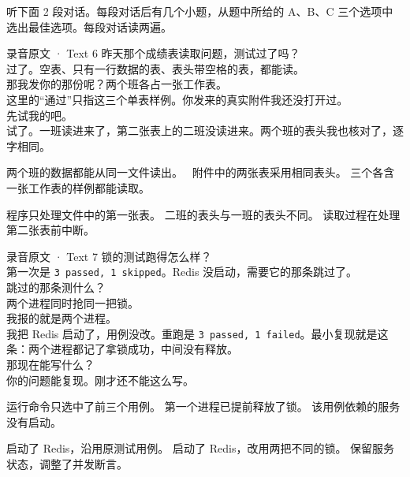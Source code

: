 \documentclass[UTF8, zihao=5, a4paper, fontset=fandol]{ctexart}
\begin{document}

听下面 2 段对话。每段对话后有几个小题，从题中所给的 A、B、C 三个选项中选出最佳选项。每段对话读两遍。

\medskip{}
\begin{ListeningScript}{录音原文 · Text 6}
\urole 昨天那个成绩表读取问题，测试过了吗？\\
\arole 过了。空表、只有一行数据的表、表头带空格的表，都能读。\\
\urole 那我发你的那份呢？两个班各占一张工作表。\\
\arole 这里的“通过”只指这三个单表样例。你发来的真实附件我还没打开过。\\
\urole 先试我的吧。\\
\arole 试了。一班读进来了，第二张表上的二班没读进来。两个班的表头我也核对了，逐字相同。
\end{ListeningScript}

\threechoices
  {两个班的数据都能从同一文件读出。}
  {\utag~附件中的两张表采用相同表头。}
  {三个各含一张工作表的样例都能读取。}

\threechoices
  {程序只处理文件中的第一张表。}
  {二班的表头与一班的表头不同。}
  {读取过程在处理第二张表前中断。}

\medskip{}
\begin{ListeningScript}{录音原文 · Text 7}
\urole 锁的测试跑得怎么样？\\
\arole 第一次是 \texttt{3 passed, 1 skipped}。Redis 没启动，需要它的那条跳过了。\\
\urole 跳过的那条测什么？\\
\arole 两个进程同时抢同一把锁。\\
\urole 我报的就是两个进程。\\
\arole 我把 Redis 启动了，用例没改。重跑是 \texttt{3 passed, 1 failed}。最小复现就是这条：两个进程都记了拿锁成功，中间没有释放。\\
\urole 那现在能写什么？\\
\arole 你的问题能复现。刚才还不能这么写。
\end{ListeningScript}

\threechoices
  {运行命令只选中了前三个用例。}
  {第一个进程已提前释放了锁。}
  {该用例依赖的服务没有启动。}

\threechoices
  {启动了 Redis，沿用原测试用例。}
  {启动了 Redis，改用两把不同的锁。}
  {保留服务状态，调整了并发断言。}
\end{document}
